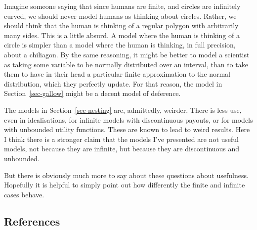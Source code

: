 \documentclass[
  11pt,
  letterpaper,
  DIV=11,
  numbers=noendperiod,
  twoside]{scrartcl}
\begin{document}
Imagine someone saying that since humans are finite, and circles are
infinitely curved, we should never model humans as thinking about
circles. Rather, we should think that the human is thinking of a regular
polygon with arbitrarily many sides. This is a little absurd. A model
where the human is thinking of a circle is simpler than a model where
the human is thinking, in full precision, about a chiliagon. By the same
reasoning, it might be better to model a scientist as taking some
variable to be normally distributed over an interval, than to take them
to have in their head a particular finite approximation to the normal
distribution, which they perfectly update. For that reason, the model in
Section~\ref{sec-gallow} might be a decent model of deference.

The models in Section~\ref{sec-nesting} are, admittedly, weirder. There
is less use, even in idealisations, for infinite models with
discontinuous payouts, or for models with unbounded utility functions.
These are known to lead to weird results. Here I think there is a
stronger claim that the models I've presented are not useful models, not
because they are infinite, but because they are discontinuous and
unbounded.

But there is obviously much more to say about these questions about
usefulness. Hopefully it is helpful to simply point out how differently
the finite and infinite cases behave.

\subsection*{References}\label{references}
\end{document}
